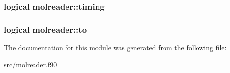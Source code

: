 \hypertarget{classmolreader_a29899cd9778ac12af6bad404c1092518}{
\subsubsection[{timing}]{\setlength{\rightskip}{0pt plus 5cm}logical molreader\-::timing\hspace{0.3cm}{\ttfamily [private]}}}\label{classmolreader_a29899cd9778ac12af6bad404c1092518}
\hypertarget{classmolreader_aec460f295b88cb8eb8dd58901edce0ba}{
\subsubsection[{to}]{\setlength{\rightskip}{0pt plus 5cm}logical molreader\-::to\hspace{0.3cm}{\ttfamily [private]}}}\label{classmolreader_aec460f295b88cb8eb8dd58901edce0ba}


The documentation for this module was generated from the following file\-:\begin{DoxyCompactItemize}
\item 
src/\hyperlink{molreader_8f90}{molreader.\-f90}\end{DoxyCompactItemize}
